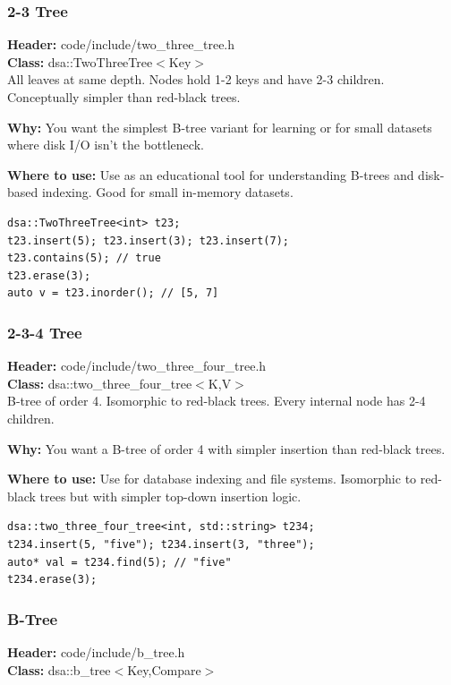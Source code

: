 \documentclass[11pt]{article}
\begin{document}
\subsubsection{2-3 Tree}
\textbf{Header:} code/include/two\_three\_tree.h\\
\textbf{Class:} dsa::TwoThreeTree$<$Key$>$\\

All leaves at same depth. Nodes hold 1-2 keys and have 2-3 children. Conceptually simpler than red-black trees.

\textbf{Why:} You want the simplest B-tree variant for learning or for small datasets where disk I/O isn't the bottleneck. \par \textbf{Where to use:} Use as an educational tool for understanding B-trees and disk-based indexing. Good for small in-memory datasets.

\begin{lstlisting}
dsa::TwoThreeTree<int> t23;
t23.insert(5); t23.insert(3); t23.insert(7);
t23.contains(5); // true
t23.erase(3);
auto v = t23.inorder(); // [5, 7]
\end{lstlisting}

\subsubsection{2-3-4 Tree}
\textbf{Header:} code/include/two\_three\_four\_tree.h\\
\textbf{Class:} dsa::two\_three\_four\_tree$<$K,V$>$\\

B-tree of order 4. Isomorphic to red-black trees. Every internal node has 2-4 children.

\textbf{Why:} You want a B-tree of order 4 with simpler insertion than red-black trees. \par \textbf{Where to use:} Use for database indexing and file systems. Isomorphic to red-black trees but with simpler top-down insertion logic.

\begin{lstlisting}
dsa::two_three_four_tree<int, std::string> t234;
t234.insert(5, "five"); t234.insert(3, "three");
auto* val = t234.find(5); // "five"
t234.erase(3);
\end{lstlisting}

\subsubsection{B-Tree}
\textbf{Header:} code/include/b\_tree.h\\
\textbf{Class:} dsa::b\_tree$<$Key,Compare$>$\\
\end{document}
